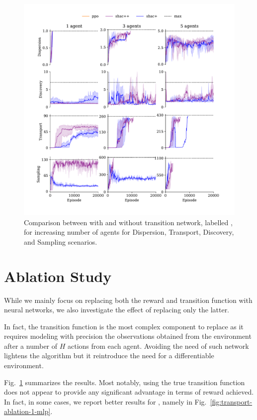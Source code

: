 \begin{figure}[!t]
    \centering
    \includegraphics[width=\textwidth]{figs/ablation-transformer.pdf}
    \caption{Comparison between \fname{} with and without transition network, labelled \fnamer{}, for increasing number of agents for Dispersion, Transport, Discovery, and Sampling scenarios.}
    \label{fig:ablation}
\end{figure}




\section{Ablation Study}\label{sect:ablation}
While we mainly focus on replacing both the reward and transition function with neural networks, we also investigate the effect of replacing only the latter. 

In fact, the transition function is the most complex component to replace as it requires modeling with precision the observations obtained from the environment after a number of $H$ actions from each agent. Avoiding the need of such network lightens the algorithm but it reintroduce the need for a differentiable environment.

Fig.~\ref{fig:ablation} summarizes the results. Most notably, using the true transition function does not appear to provide any significant advantage in terms of reward achieved. In fact, in some cases, we report better results for \fname{}, namely in Fig.~\ref{fig:transport-ablation-1-mlp}. 
